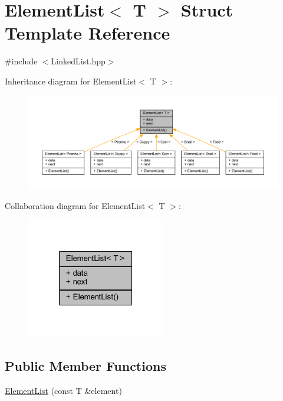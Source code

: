 \hypertarget{struct_element_list}{}\section{Element\+List$<$ T $>$ Struct Template Reference}
\label{struct_element_list}


{\ttfamily \#include $<$Linked\+List.\+hpp$>$}



Inheritance diagram for Element\+List$<$ T $>$\+:\nopagebreak
\begin{figure}[H]
\begin{center}
\leavevmode
\includegraphics[width=350pt]{struct_element_list__inherit__graph}
\end{center}
\end{figure}


Collaboration diagram for Element\+List$<$ T $>$\+:\nopagebreak
\begin{figure}[H]
\begin{center}
\leavevmode
\includegraphics[width=172pt]{struct_element_list__coll__graph}
\end{center}
\end{figure}
\subsection*{Public Member Functions}
\begin{DoxyCompactItemize}
\item 
\mbox{\hyperlink{struct_element_list_a2f2c3bfdd0cda10f2e50f8f04758b52a}{Element\+List}} (const T \&element)
\end{DoxyCompactItemize}
